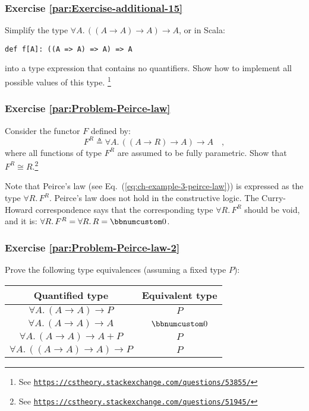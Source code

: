 \subsubsection{Exercise \label{par:Exercise-additional-15}\ref{par:Exercise-additional-15}}

Simplify the type $\forall A.\,((A\rightarrow A)\rightarrow A)\rightarrow A$,
or in Scala:
\begin{lstlisting}
def f[A]: ((A => A) => A) => A
\end{lstlisting}
into a type expression that contains no quantifiers. Show how to implement
all possible values of this type. \footnote{See \texttt{\href{https://cstheory.stackexchange.com/questions/53855/}{https://cstheory.stackexchange.com/questions/53855/}}}

\subsubsection{Exercise \label{par:Problem-Peirce-law}\ref{par:Problem-Peirce-law}}

Consider the functor $F$ defined by:
\[
F^{R}\triangleq\forall A.\,((A\rightarrow R)\rightarrow A)\rightarrow A\quad,
\]
where all functions of type $F^{R}$ are assumed to be fully parametric.
Show that $F^{R}\cong R$.\footnote{See \texttt{\href{https://cstheory.stackexchange.com/questions/51945/}{https://cstheory.stackexchange.com/questions/51945/}}}

Note that Peirce\textsf{'}s law (see Eq.~(\ref{eq:ch-example-3-peirce-law}))
is expressed as the type $\forall R.\,F^{R}$. Peirce\textsf{'}s law does not
hold in the constructive logic. The Curry-Howard correspondence says
that the corresponding type $\forall R.\,F^{R}$ should be void, and
it is: $\forall R.\,F^{R}=\forall R.\,R=\bbnum 0$. 

\subsubsection{Exercise \label{par:Problem-Peirce-law-2}\ref{par:Problem-Peirce-law-2}}

Prove the following type equivalences (assuming a fixed type $P$):

\begin{tabular}{|c|c|}
\hline 
\textbf{\footnotesize{}Quantified type} & \textbf{\footnotesize{}Equivalent type}\tabularnewline
\hline 
\hline 
$\forall A.\,(A\rightarrow A)\rightarrow P$ & $P$\tabularnewline
\hline 
$\forall A.\,(A\rightarrow A)\rightarrow A$ & $\bbnum 0$\tabularnewline
\hline 
$\forall A.\,(A\rightarrow A)\rightarrow A+P$ & $P$\tabularnewline
\hline 
$\forall A.\,((A\rightarrow A)\rightarrow A)\rightarrow P$ & $P$\tabularnewline
\hline 
\end{tabular}

